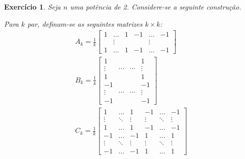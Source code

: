 \documentclass{article}
\newtheorem{ex}{Exercício}
\begin{document}
\begin{ex}\label{exabc}
Seja $n$ uma potência de 2. Considere-se a seguinte construção.

Para $k$ par, definam-se as seguintes matrizes $k \times k$:
\begin{gather*}
A_k = \frac1k \begin{bmatrix}
1 & \dots & 1 & -1 & \dots & -1\\
& \vdots & & &\vdots &\\
1 & \dots & 1 & -1 & \dots & -1
\end{bmatrix}\\
B_k = \frac1k \begin{bmatrix}
1 & & & 1 \\
\vdots & \cdots & \cdots & \vdots \\
1 & & & 1\\
-1 & & & -1 \\
\vdots & \cdots & \cdots & \vdots \\
-1 & & & -1
\end{bmatrix}\\
C_k = \frac1k \begin{bmatrix}
1 & \dots & 1 & -1 & \dots & -1\\
\vdots & \ddots & \vdots & \vdots & \ddots & \vdots\\
1 & \dots & 1 & -1 & \dots & -1\\
-1 & \dots & -1 & 1 & \dots & 1\\
\vdots & \ddots & \vdots & \vdots & \ddots & \vdots\\
-1 & \dots & -1 & 1 & \dots & 1
\end{bmatrix}
\end{gather*}


\end{ex}
\end{document}
